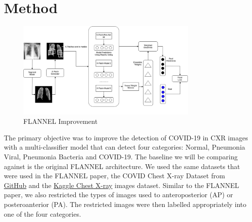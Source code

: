 \documentclass{sigkddExp}
\begin{document}
\section{Method}

\begin{figure}[h]
    \centering
    \includegraphics[width=0.8\textwidth]{../doc/images/FLANNEL-IMPROVED.png}
    \caption{FLANNEL Improvement}
    \label{fig:improve}
\end{figure}

The primary objective was to improve the detection of COVID-19 in CXR images
with a multi-classifier model that can detect four categories: Normal, Pneumonia
Viral, Pneumonia Bacteria and COVID-19. The baseline we will be comparing
against is the original FLANNEL architecture. We used the same datasets that
were used in the FLANNEL paper, the COVID Chest X-ray Dataset
\cite{cohen2020covidProspective} from
\href{https://github.com/ieee8023/covid-chestxray-dataset/tree/78543292f8b01d5e0ed1d0e15dce71949f0657bb}{GitHub} and the
\href{https://www.kaggle.com/paultimothymooney/chest-xray-pneumonia}{Kaggle
    Chest X-ray} images dataset. Similar to the FLANNEL paper, we also restricted
the types of images used to anteroposterior (AP) or posteroanterior (PA). The
restricted images were then labelled appropriately into one of the four
categories.
\end{document}
